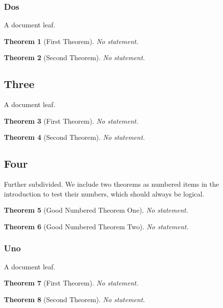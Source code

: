 \documentclass[10pt,]{article}
\theoremstyle{plain}
\newtheorem{theorem}{Theorem}[section]
\theoremstyle{definition}
\theoremstyle{definition}
\theoremstyle{definition}
\theoremstyle{definition}
\theoremstyle{definition}
\theoremstyle{definition}
\numberwithin{equation}{section}
\begin{document}
\subsubsection[{Dos}]{Dos}\label{subsubsection-7}
\hypertarget{p-766}{}%
A document leaf.%
\begin{theorem}[{First Theorem}]\label{theorem-number-05}
\hypertarget{p-767}{}%
No statement.%
\end{theorem}
\begin{theorem}[{Second Theorem}]\label{theorem-number-06}
\hypertarget{p-768}{}%
No statement.%
\end{theorem}
\typeout{************************************************}
\typeout{************************************************}
\subsection[{Three}]{Three}\label{subsection-54}
\hypertarget{p-769}{}%
A document leaf.%
\begin{theorem}[{First Theorem}]\label{theorem-number-07}
\hypertarget{p-770}{}%
No statement.%
\end{theorem}
\begin{theorem}[{Second Theorem}]\label{theorem-number-08}
\hypertarget{p-771}{}%
No statement.%
\end{theorem}
\typeout{************************************************}
\typeout{************************************************}
\subsection[{Four}]{Four}\label{subsection-55}
\hypertarget{p-772}{}%
Further subdivided.  We include two theorems as numbered items in the introduction to test their numbers, which should always be logical.%
\begin{theorem}[{Good Numbered Theorem One}]\label{theorem-good-one}
\hypertarget{p-773}{}%
No statement.%
\end{theorem}
\begin{theorem}[{Good Numbered Theorem Two}]\label{theorem-good-two}
\hypertarget{p-774}{}%
No statement.%
\end{theorem}
\typeout{************************************************}
\typeout{************************************************}
\subsubsection[{Uno}]{Uno}\label{subsubsection-8}
\hypertarget{p-775}{}%
A document leaf.%
\begin{theorem}[{First Theorem}]\label{theorem-number-09}
\hypertarget{p-776}{}%
No statement.%
\end{theorem}
\begin{theorem}[{Second Theorem}]\label{theorem-number-10}
\hypertarget{p-777}{}%
No statement.%
\end{theorem}
\typeout{************************************************}
\typeout{************************************************}
\end{document}
